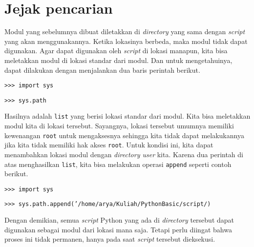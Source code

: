 

\section{Jejak pencarian}
Modul yang sebelumnya dibuat diletakkan di \textit{directory} yang sama dengan \textit{script} yang akan menggunakannya. Ketika lokasinya berbeda, maka modul tidak dapat digunakan. Agar dapat digunakan oleh \textit{script} di lokasi manapun, kita bisa meletakkan modul di lokasi standar dari modul. Dan untuk mengetahuinya, dapat dilakukan dengan menjalankan dua baris perintah berikut.

\texttt{>>> import sys}

\texttt{>>> sys.path}

Hasilnya adalah \texttt{list} yang berisi lokasi standar dari modul. Kita bisa meletakkan modul kita di lokasi tersebut. Sayangnya, lokasi tersebut umumnya memiliki kewenangan \texttt{root} untuk mengaksesnya sehingga kita tidak dapat melakukannya jika kita tidak memiliki hak akses \texttt{root}. Untuk kondisi ini, kita dapat menambahkan lokasi modul dengan \textit{directory user} kita. Karena dua perintah di atas menghasilkan \texttt{list}, kita bisa melakukan operasi \texttt{append} seperti contoh berikut.

\texttt{>>> import sys}

\texttt{>>> sys.path.append('/home/arya/Kuliah/PythonBasic/script/)}

Dengan demikian, semua \textit{script} Python yang ada di \textit{directory} tersebut dapat digunakan sebagai modul dari lokasi mana saja. Tetapi perlu diingat bahwa proses ini tidak permanen, hanya pada saat \textit{script} tersebut dieksekusi.
